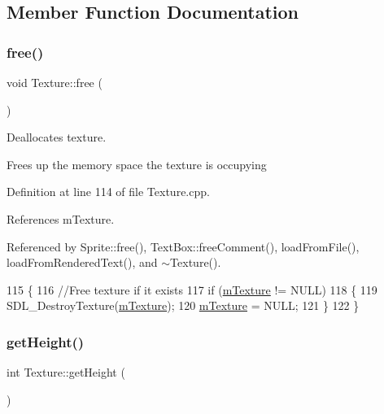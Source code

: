 \subsection{Member Function Documentation}
\mbox{\label{class_texture_a46d06aec832e5a954f1c8ca957c2c6e5}} 
\subsubsection{\texorpdfstring{free()}{free()}}
{\footnotesize\ttfamily void Texture\+::free (\begin{DoxyParamCaption}{ }\end{DoxyParamCaption})}



Deallocates texture. 

Frees up the memory space the texture is occupying 

Definition at line 114 of file Texture.\+cpp.



References m\+Texture.



Referenced by Sprite\+::free(), Text\+Box\+::free\+Comment(), load\+From\+File(), load\+From\+Rendered\+Text(), and $\sim$\+Texture().


\begin{DoxyCode}
115 \{
116     \textcolor{comment}{//Free texture if it exists}
117     \textcolor{keywordflow}{if} (\hyperlink{class_texture_a28e61626f21dd1c69968e53687a13424}{mTexture} != NULL)
118     \{
119         SDL\_DestroyTexture(\hyperlink{class_texture_a28e61626f21dd1c69968e53687a13424}{mTexture});
120         \hyperlink{class_texture_a28e61626f21dd1c69968e53687a13424}{mTexture} = NULL;
121     \}
122 \}
\end{DoxyCode}
\mbox{\label{class_texture_a80e143905655b173df5994300088ce35}} 
\subsubsection{\texorpdfstring{get\+Height()}{getHeight()}}
{\footnotesize\ttfamily int Texture\+::get\+Height (\begin{DoxyParamCaption}{ }\end{DoxyParamCaption})}



